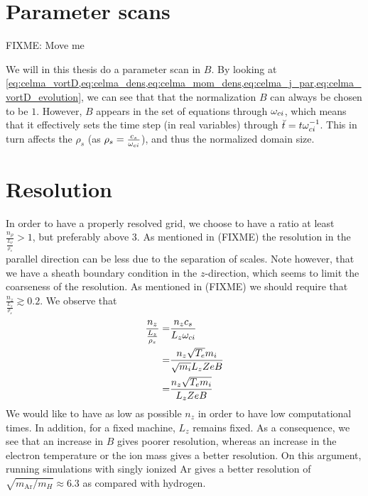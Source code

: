 \section{Parameter scans}
FIXME: Move me

%
We will in this thesis do a parameter scan in $B$.
By looking at \cref{eq:celma_vortD,eq:celma_dens,eq:celma_mom_dens,eq:celma_j_par,eq:celma_vortD_evolution}, we can see that that the normalization $B$ can always be chosen to be $1$.
However, $B$ appears in the set of equations through $\omega_{ci}$, which means that it effectively sets the time step (in real variables) through $\breve{t}=t\omega_{ci}^{-1}$.
This in turn affects the $\rho_s$ (as $\rho_s=\frac{c_s}{\omega_{ci}}$), and thus the normalized domain size.

\section{Resolution}
%
In order to have a properly resolved grid, we choose to have a ratio at least $\frac{n_\rho}{\frac{L_\rho}{\rho_s}}>1$, but preferably above  $3$.
As mentioned in (FIXME)
the resolution in the parallel direction can be less due to the separation of scales.
Note however, that we have a sheath boundary condition in the $z$-direction, which seems to limit the coarseness of the resolution.
As mentioned in (FIXME)
we should require that $\frac{n_z}{\frac{L_z}{\rho_s}}\gtrsim0.2$.
We observe that
%
\begin{align*}
    \frac{n_z}{\frac{L_z}{\rho_s}}
    =& \frac{n_zc_s}{L_z \omega_{ci}}
    \\
    =& \frac{n_z\sqrt{T_e}m_i}{\sqrt{m_i} L_z ZeB}
    \\
    =& \frac{n_z\sqrt{T_em_i}}{L_z ZeB}
\end{align*}
%
We would like to have as low as possible $n_z$ in order to have low computational times.
In addition, for a fixed machine, $L_z$ remains fixed.
As a consequence, we see that an increase in $B$ gives poorer resolution, whereas an increase in the electron temperature or the ion mass gives a better resolution.
On this argument, running simulations with singly ionized Ar gives a better resolution of $\sqrt{m_{\text{Ar}}/m_H}\approx6.3$ as compared with hydrogen.
